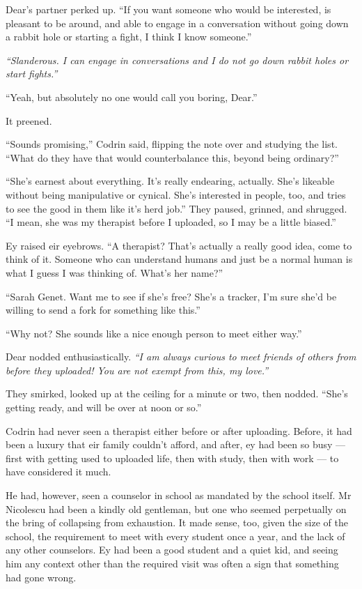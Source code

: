 Dear's partner perked up. ``If you want someone who would be interested, is pleasant to be around, and able to engage in a conversation without going down a rabbit hole or starting a fight, I think I know someone.''

\emph{``Slanderous. I can engage in conversations and I do not go down rabbit holes or start fights.''}

``Yeah, but absolutely no one would call you boring, Dear.''

It preened.

``Sounds promising,'' Codrin said, flipping the note over and studying the list. ``What do they have that would counterbalance this, beyond being ordinary?''

``She's earnest about everything. It's really endearing, actually. She's likeable without being manipulative or cynical. She's interested in people, too, and tries to see the good in them like it's herd job.'' They paused, grinned, and shrugged. ``I mean, she was my therapist before I uploaded, so I may be a little biased.''

Ey raised eir eyebrows. ``A therapist? That's actually a really good idea, come to think of it. Someone who can understand humans and just be a normal human is what I guess I was thinking of. What's her name?''

``Sarah Genet. Want me to see if she's free? She's a tracker, I'm sure she'd be willing to send a fork for something like this.''

``Why not? She sounds like a nice enough person to meet either way.''

Dear nodded enthusiastically. \emph{``I am always curious to meet friends of others from before they uploaded! You are not exempt from this, my love.''}

They smirked, looked up at the ceiling for a minute or two, then nodded. ``She's getting ready, and will be over at noon or so.''

Codrin had never seen a therapist either before or after uploading. Before, it had been a luxury that eir family couldn't afford, and after, ey had been so busy — first with getting used to uploaded life, then with study, then with work — to have considered it much.

He had, however, seen a counselor in school as mandated by the school itself. Mr Nicolescu had been a kindly old gentleman, but one who seemed perpetually on the bring of collapsing from exhaustion. It made sense, too, given the size of the school, the requirement to meet with every student once a year, and the lack of any other counselors. Ey had been a good student and a quiet kid, and seeing him any context other than the required visit was often a sign that something had gone wrong.

